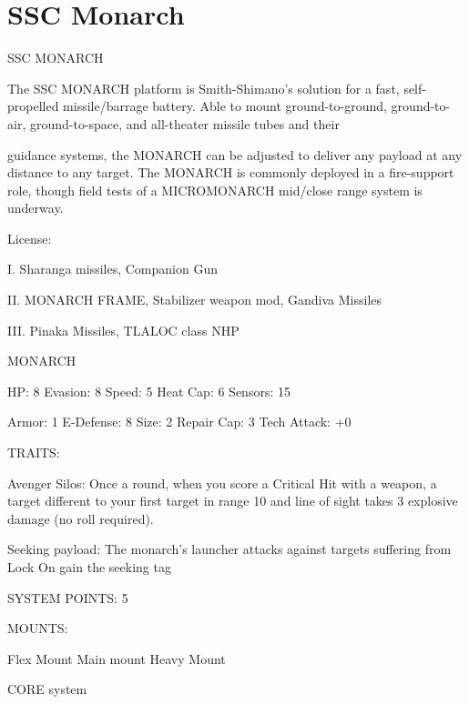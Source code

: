 \section{SSC Monarch}

                                             SSC MONARCH   

The SSC MONARCH platform is Smith-Shimano’s solution for a fast, self-propelled missile/barrage battery.  
Able to mount ground-to-ground, ground-to-air, ground-to-space, and all-theater missile tubes and their  

guidance systems, the MONARCH can be adjusted to deliver any payload at any distance to any target.  
The MONARCH is commonly deployed in a fire-support role, though field tests of a MICROMONARCH  
mid/close range system is underway. 
 
                                                     License:
 
I. Sharanga missiles, Companion Gun
 
II. MONARCH FRAME, Stabilizer weapon mod, Gandiva Missiles
 
III. Pinaka Missiles, TLALOC class NHP
 

                                                    MONARCH 

  HP: 8           Evasion: 8                             Speed: 5            Heat Cap: 6         Sensors: 15 

  Armor: 1        E-Defense: 8                           Size: 2             Repair Cap: 3       Tech Attack:  
                                                                                                 +0 

                                                      TRAITS: 

  Avenger Silos: Once a round, when you score a Critical Hit with a weapon, a target different to your  
  first target in range 10 and line of sight takes 3 explosive damage (no roll required).
 
  Seeking payload: The monarch’s launcher attacks against targets suffering from Lock On gain the  
  seeking tag 

                                               SYSTEM POINTS: 5 

                                                     MOUNTS: 

   Flex Mount                         Main mount                             Heavy Mount 

                                                   CORE system 


